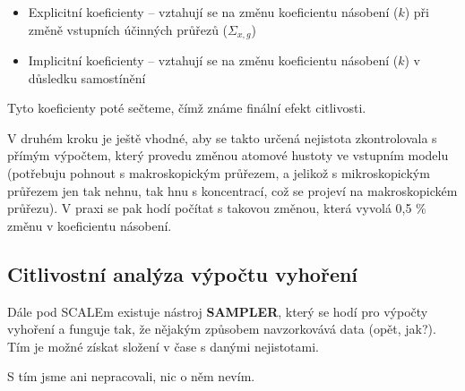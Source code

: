 \begin{itemize}
    \item Explicitní koeficienty -- vztahují se na změnu koeficientu násobení ($k$) při změně vstupních účinných průřezů ($\Sigma_{x,g}$)
    \item Implicitní koeficienty -- vztahují se na změnu koeficientu násobení ($k$) v důsledku samostínění
\end{itemize}

Tyto koeficienty poté sečteme, čímž známe finální efekt citlivosti.

V druhém kroku je ještě vhodné, aby se takto určená nejistota zkontrolovala s přímým výpočtem, který provedu změnou atomové hustoty ve vstupním modelu (potřebuju pohnout s makroskopickým průřezem, a jelikož s mikroskopickým průřezem jen tak nehnu, tak hnu s koncentrací, což se projeví na makroskopickém průřezu). V praxi se pak hodí počítat s takovou změnou, která vyvolá 0,5 \% změnu v koeficientu násobení.

\subsection{Citlivostní analýza výpočtu vyhoření}

Dále pod SCALEm existuje nástroj \textbf{SAMPLER}, který se hodí pro výpočty vyhoření a funguje tak, že nějakým způsobem navzorkovává data (opět, jak?). Tím je možné získat složení v čase s danými nejistotami.

S tím jsme ani nepracovali, nic o něm nevím.